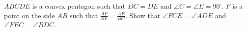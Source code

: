 $ABCDE$ is a convex pentagon such that $DC = DE$ and $\angle C = \angle E = 90^{\cdot}$. $F$ is a point on the side $AB$ such that $\frac{AF}{BF}= \frac{AE}{BC}$. Show that $\angle FCE = \angle ADE$ and $\angle FEC = \angle BDC$.